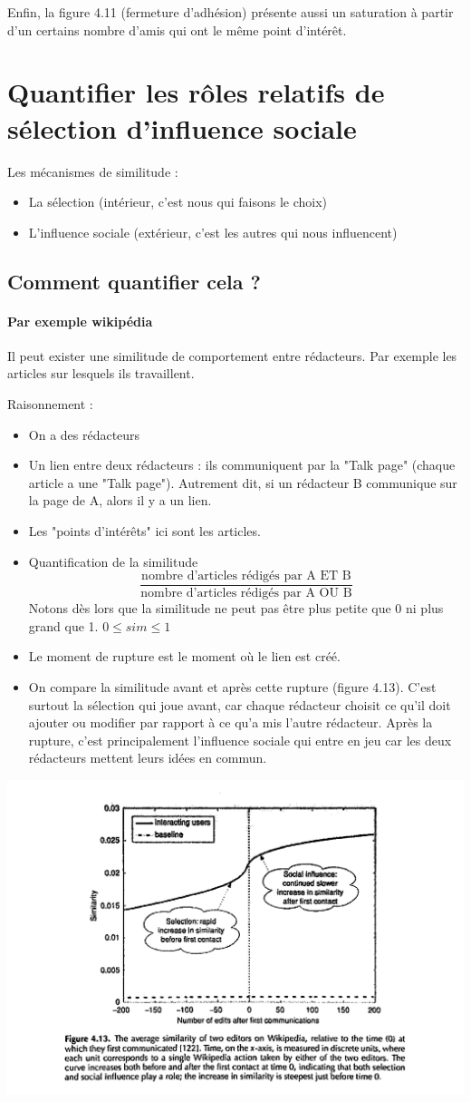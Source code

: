 Enfin, la figure 4.11 (fermeture d'adhésion) présente aussi un saturation à partir d'un certains nombre d'amis qui ont le même point d'intérêt.

\section{Quantifier les rôles relatifs de sélection d'influence sociale}
Les mécanismes de similitude :
\begin{itemize}
\item La sélection (intérieur, c'est nous qui faisons le choix)
\item L'influence sociale (extérieur, c'est les autres qui nous influencent) 
\end{itemize}
\subsection{Comment quantifier cela ?}
\paragraph*{Par exemple wikipédia}
Il peut exister une similitude de comportement entre rédacteurs. Par exemple les articles sur lesquels ils travaillent.

Raisonnement :
\begin{itemize}
\item On a des rédacteurs
\item Un lien entre deux rédacteurs : ils communiquent par la "Talk page" (chaque article a une "Talk page"). Autrement dit, si un rédacteur B communique sur la page de A, alors il y a un lien.
\item Les "points d'intérêts" ici sont les articles.
\item Quantification de la similitude
	$$\displaystyle\frac{\mbox{nombre d'articles rédigés par A ET B}}{\mbox{nombre d'articles rédigés par A OU B}}$$
Notons dès lors que la similitude ne peut pas être plus petite que 0 ni plus grand que 1. $0 \leq sim \leq 1$
\item Le moment de rupture est le moment où le lien est créé.
\item On compare la similitude avant et après cette rupture (figure 4.13). C'est surtout la sélection qui joue avant, car chaque rédacteur choisit ce qu'il doit ajouter ou modifier par rapport à ce qu'a mis l'autre rédacteur. Après la rupture, c'est principalement l'influence sociale qui entre en jeu car les deux rédacteurs mettent leurs idées en commun. %
\end{itemize}

\includegraphics[width=\textwidth]{images/21_wikipedia.jpg}